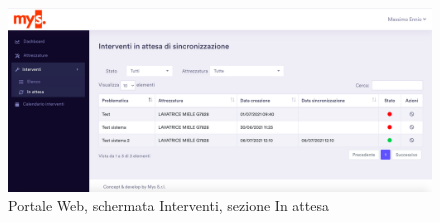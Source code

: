 \begin{figure}[!h] 
	\centering 
	\includegraphics[scale = 0.6]{immagini/portale/interventi-in-attesa.png} 
	\caption {Portale Web, schermata Interventi, sezione In attesa}
\end{figure}

\pagebreak
